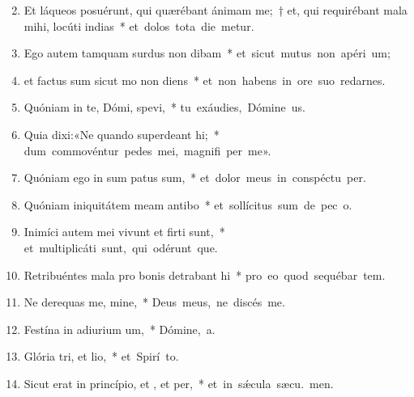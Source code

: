 \begin{flushleft}
\begin{enumerate}[leftmargin=*]
\setcounter{enumi}{1}

\item Et láqueos posuérunt, qui quærébant ánimam me;~† et, qui requirébant mala mihi, locúti  indias~* \mbox{et dolos tota die metur.}

\item Ego autem tamquam surdus non dibam~* \mbox{et sicut mutus non apéri  um;}

\item et factus sum sicut mo non diens~* \mbox{et non habens in ore suo redarnes.}

\item Quóniam in te, Dómi, spevi,~* \mbox{tu exáudies, Dómine  us.}

\item Quia dixi:«Ne quando superdeant hi;~* \mbox{dum commovéntur pedes mei, magnifi per me».}

\item Quóniam ego in sum patus sum,~* \mbox{et dolor meus in conspéctu  per.}

\item Quóniam iniquitátem meam antibo~* \mbox{et sollícitus sum de pec o.}

\item Inimíci autem mei vivunt et firti sunt,~* \mbox{et multiplicáti sunt, qui odérunt  que.}

\item Retribuéntes mala pro bonis detrabant hi~* \mbox{pro eo quod sequébar tem.}

\item Ne derequas me, mine,~* \mbox{Deus meus, ne discés  me.}

\item Festína in adiurium um,~* \mbox{Dómine,  a.}

\item Glória tri, et lio,~* \mbox{et Spirí to.}

\item Sicut erat in princípio, et , et per,~* \mbox{et in s\'{\ae}cula sæcu. men.}

\end{enumerate}
\end{flushleft}

